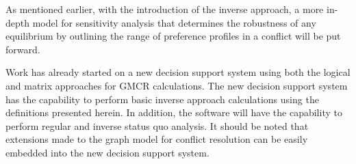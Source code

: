 \documentclass[letterpaper,12pt,titlepage,oneside,final]{book}
\begin{document}
As mentioned earlier, with the introduction of the inverse approach, a more in-depth model for sensitivity analysis that determines the robustness of any equilibrium by outlining the range of preference profiles in a conflict will be put forward. 

Work has already started on a new decision support system using both the logical and matrix approaches for GMCR calculations. The new decision support system has the capability to perform basic inverse approach calculations using the definitions presented herein. In addition, the software will have the capability to perform regular and inverse status quo analysis. It should be noted that extensions made to the graph model for conflict resolution can be easily embedded into the new decision support system.
\end{document}
